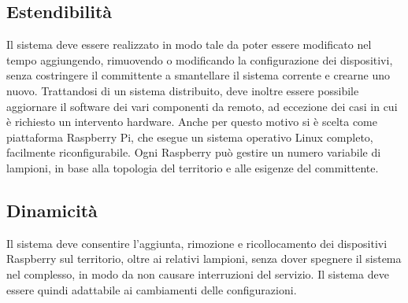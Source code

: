 \subsection{Estendibilità}
Il sistema deve essere realizzato in modo tale da poter essere modificato nel tempo aggiungendo, rimuovendo o modificando la configurazione dei dispositivi, senza costringere il committente a smantellare il sistema corrente e crearne uno nuovo. Trattandosi di un sistema distribuito, deve inoltre essere possibile aggiornare il software dei vari componenti da remoto, ad eccezione dei casi in cui è richiesto un intervento hardware. Anche per questo motivo si è scelta come piattaforma Raspberry Pi, che esegue un sistema operativo Linux completo, facilmente riconfigurabile. Ogni Raspberry può gestire un numero variabile di lampioni, in base alla topologia del territorio e alle esigenze del committente.
\subsection{Dinamicità}
Il sistema deve consentire l'aggiunta, rimozione e ricollocamento dei dispositivi Raspberry sul territorio, oltre ai relativi lampioni, senza dover spegnere il sistema nel complesso, in modo da non causare interruzioni del servizio. Il sistema deve essere quindi adattabile ai cambiamenti delle configurazioni.
